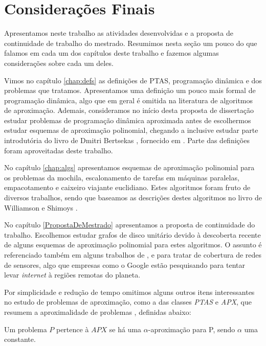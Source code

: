 \chapter{Considerações Finais}

Apresentamos neste trabalho as atividades desenvolvidas e a proposta de continuidade de trabalho do mestrado. Resumimos nesta seção um pouco do que falamos em cada um dos capítulos deste trabalho e fazemos algumas considerações sobre cada um deles.

Vimos no capítulo \ref{chap:defs} as definições de PTAS, programação dinâmica e dos problemas que tratamos. Apresentamos uma definição um pouco mais formal de programação dinâmica, algo que em geral é omitida na literatura de algoritmos de aproximação. Ademais, consideramos no início desta proposta de dissertação estudar problemas de programação dinâmica aproximada antes de escolhermos estudar esquemas de aproximação polinomial, chegando a inclusive estudar parte introdutória do livro de Dmitri Bertsekas , fornecido em \cite{Bertsekas}. Parte das definições foram aproveitadas deste trabalho.

No capítulo \ref{chap:algs} apresentamos esquemas de aproximação polinomial para os problemas da mochila, escalonamento de tarefas em máquinas paralelas, empacotamento e caixeiro viajante euclidiano. Estes algoritmos foram fruto de diversos trabalhos, sendo que baseamos as descrições destes algoritmos no livro de Williamson e Shimoys \cite{Williamson}.

No capítulo \ref{PropostaDeMestrado} apresentamos a proposta de continuidade do trabalho. Escolhemos estudar grafos de disco unitário devido à descoberta recente de alguns esquemas de aproximação polinomial para estes algoritmos. O assunto é referenciado também em alguns trabalhos de \cite{Huang}, \cite{gupta} e \cite{li} para tratar de cobertura de redes de sensores, algo que empresas como o Google \cite{googleloon} estão pesquisando para tentar levar \textit{internet} à regiões remotas do planeta. 

Por simplicidade e redução de tempo omitimos alguns outros itens interessantes no estudo de problemas de aproximação, como a das classes \textit{PTAS} e \textit{APX}, que resumem a aproximalidade de problemas \cite{ComplexityZoo}, definidas abaixo:

\begin{definition}[APX]
Um problema $P$ pertence à $APX$ se há uma $\alpha$-aproximação para P, sendo $\alpha$ uma constante.
\end{definition}

